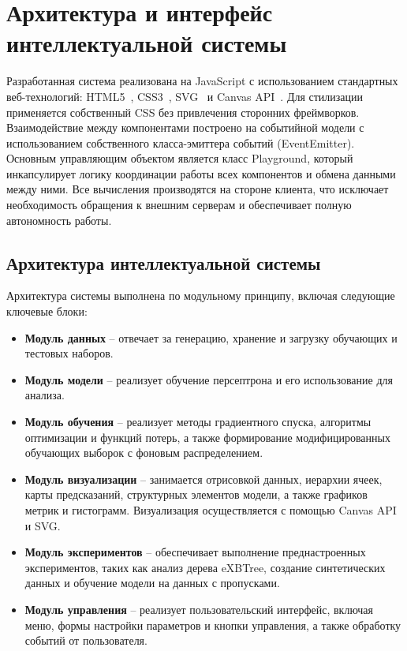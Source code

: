 \section{Архитектура и интерфейс интеллектуальной системы}

Разработанная система реализована на JavaScript с использованием стандартных веб-технологий: HTML5~\cite{hickson2011html5}, CSS3~\cite{lunn2012css3}, SVG~\cite{quint2003scalable} и Canvas API~\cite{lubbers2010using}. Для стилизации применяется собственный CSS без привлечения сторонних фреймворков. Взаимодействие между компонентами построено на событийной модели с использованием собственного класса-эмиттера событий (EventEmitter). Основным управляющим объектом является класс Playground, который инкапсулирует логику координации работы всех компонентов и обмена данными между ними. Все вычисления производятся на стороне клиента, что исключает необходимость обращения к внешним серверам и обеспечивает полную автономность работы.

\subsection{Архитектура интеллектуальной системы}

Архитектура системы выполнена по модульному принципу, включая следующие ключевые блоки:

\begin{itemize}
    \item \textbf{Модуль данных} -- отвечает за генерацию, хранение и загрузку обучающих и тестовых наборов.
    \item \textbf{Модуль модели} -- реализует обучение персептрона и его использование для анализа.
    \item \textbf{Модуль обучения} -- реализует методы градиентного спуска, алгоритмы оптимизации и функций потерь, а также формирование модифицированных обучающих выборок с фоновым распределением.
    \item \textbf{Модуль визуализации} -- занимается отрисовкой данных, иерархии ячеек, карты предсказаний, структурных элементов модели, а также графиков метрик и гистограмм. Визуализация осуществляется с помощью Canvas API и SVG.
    \item \textbf{Модуль экспериментов} -- обеспечивает выполнение преднастроенных экспериментов, таких как анализ дерева eXBTree, создание синтетических данных и обучение модели на данных с пропусками.
    \item \textbf{Модуль управления} -- реализует пользовательский интерфейс, включая меню, формы настройки параметров и кнопки управления, а также обработку событий от пользователя.
\end{itemize}

